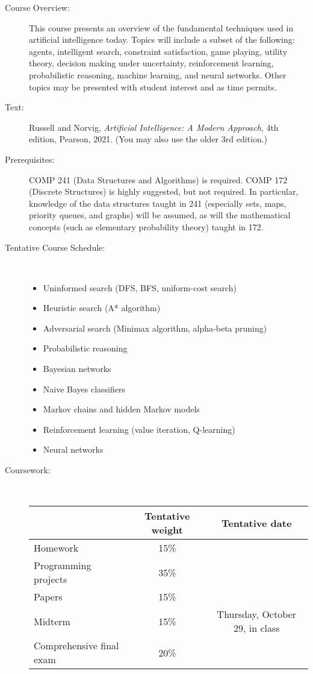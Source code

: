\documentclass [letterpaper,11pt]{article}
\begin{document}
\begin{description}

\item[Course Overview:]
This course presents an overview of the fundamental techniques used in artificial intelligence today. Topics will include a subset of the following: agents, intelligent search, constraint satisfaction, game playing, utility theory, decision making under uncertainty, reinforcement learning, probabilistic reasoning, machine learning, and neural networks. Other topics may be presented with student interest and as time permits.

\item[Text:]
Russell and Norvig, \emph{Artificial Intelligence: A Modern Approach}, 4th edition, Pearson, 2021. (You may also use the older 3rd edition.)

\item[Prerequisites:]
COMP 241 (Data Structures and Algorithms) is required. COMP 172 (Discrete Structures) is highly suggested, but not required. In particular, knowledge of the data structures taught in 241 (especially sets, maps, priority queues, and graphs) will be assumed, as will the mathematical concepts (such as elementary probability theory) taught in 172.



\item[Tentative Course Schedule:]\
\begin{itemize} \setlength{\itemsep}{0em}\setlength{\parskip}{0pt}
	\item Uninformed search (DFS, BFS, uniform-cost search)
	\item Heuristic search (A* algorithm)
	\item Adversarial search (Minimax algorithm, alpha-beta pruning)
	\item Probabilistic reasoning
	\item Bayesian networks
	\item Naive Bayes classifiers
	\item Markov chains and hidden Markov models
	\item Reinforcement learning (value iteration, Q-learning)
	\item Neural networks
	\end{itemize}





\item[Coursework:] \

\begin{tabular}{lcc} 
& Tentative weight & Tentative date \\ \hline
Homework & 15\% & \\
Programming projects & 35\% & \\
Papers & 15\% & \\
Midterm & 15\% & Thursday, October 29, in class\\
Comprehensive final exam & 20\% & \\
\end{tabular}


\end{description}
\end{document}
